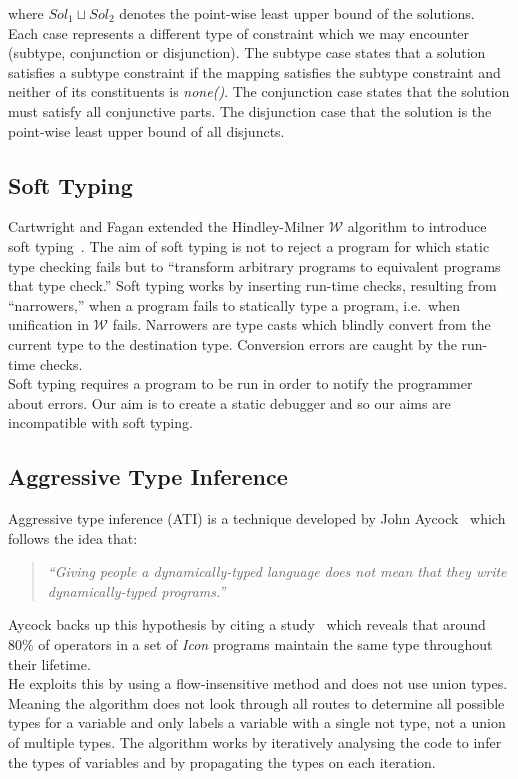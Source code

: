 \documentclass[12pt, titlepage]{article}
\begin{document}
where $Sol_1 \sqcup Sol_2$ denotes the point-wise least upper bound of the solutions. \\
Each case represents a different type of constraint which we may encounter (subtype, conjunction or disjunction). The subtype case states that a solution satisfies a subtype constraint if the mapping satisfies the subtype constraint and neither of its constituents is \textit{none()}. The conjunction case states that the solution must satisfy all conjunctive parts. The disjunction case that the solution is the point-wise least upper bound of all disjuncts.

\subsection{Soft Typing}
Cartwright and Fagan extended the Hindley-Milner $\mathcal{W}$ algorithm to introduce soft typing~\cite{cartwright91}. The aim of soft typing is not to reject a program for which static type checking fails but to ``transform arbitrary programs to equivalent programs that type check.'' Soft typing works by inserting run-time checks, resulting from ``narrowers,'' when a program fails to statically type a program, i.e.\ when unification in $\mathcal{W}$ fails. Narrowers are type casts which blindly convert from the current type to the destination type. Conversion errors are caught by the run-time checks. \\
Soft typing requires a program to be run in order to notify the programmer about errors. Our aim is to create a static debugger and so our aims are incompatible with soft typing.

\subsection{Aggressive Type Inference}
Aggressive type inference (ATI) is a technique developed by John Aycock~\cite{aggressiveType} which follows the idea that:
\begin{quote}
	\emph{``Giving people a dynamically-typed language does not mean that they write dynamically-typed programs.''}
\end{quote}
Aycock backs up this hypothesis by citing a study~\cite{typeInferenceIcon} which reveals that around 80\% of operators in a set of \textit{Icon} programs maintain the same type throughout their lifetime. \\
He exploits this by using a flow-insensitive method and does not use union types. Meaning the algorithm does not look through all routes to determine all possible types for a variable and only labels a variable with a single not type, not a union of multiple types. The algorithm works by iteratively analysing the code to infer the types of variables and by propagating the types on each iteration.
\end{document}

